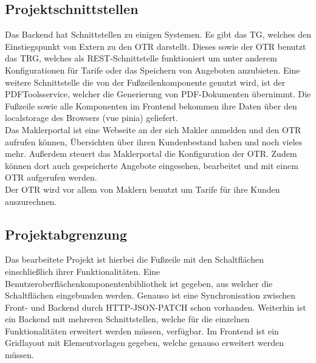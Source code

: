 \subsection{Projektschnittstellen}
\label{projektschnittstellen}
Das Backend hat Schnittstellen zu einigen Systemen. Es gibt das \ac{TG}, welches den Einstiegspunkt von Extern zu den \ac{OTR} darstellt. Dieses sowie der \ac{OTR} benutzt das \ac{TRG}, welches als REST-Schnittstelle funktioniert um unter anderem Konfigurationen für Tarife oder das Speichern von Angeboten anzubieten.
Eine weitere Schnittstelle die von der Fußzeilenkomponente genutzt wird, ist der PDFToolsservice, welcher die Generierung von PDF-Dokumenten übernimmt. Die Fußzeile sowie alle Komponenten im Frontend bekommen ihre Daten über den \gls{localstorage} des Browsers (\gls{vue} \gls{pinia}) geliefert.\\
Das Maklerportal ist eine Webseite an der sich Makler anmelden und den \ac{OTR} aufrufen können, Übersichten über ihren Kundenbestand haben und noch vieles mehr. Außerdem steuert das Maklerportal die Konfiguration der \ac{OTR}. Zudem können dort auch gespeicherte Angebote eingesehen, bearbeitet und mit einem \ac{OTR} aufgerufen werden.\\
Der \ac{OTR} wird vor allem von Maklern benutzt um Tarife für ihre Kunden auszurechnen.


\subsection{Projektabgrenzung}
\label{projektabgrenzung}
Das bearbeitete Projekt ist hierbei die Fußzeile mit den Schaltflächen einschließlich ihrer Funktionalitäten. Eine Benutzeroberflächenkomponentenbibliothek ist gegeben, aus welcher die Schaltflächen eingebunden werden. Genauso ist eine Synchronisation zwischen Front- und Backend durch HTTP-JSON-PATCH schon vorhanden. Weiterhin ist ein Backend mit mehreren Schnittstellen, welche für die einzelnen Funktionalitäten erweitert werden müssen, verfügbar. Im Frontend ist ein Gridlayout mit Elementvorlagen gegeben, welche genauso erweitert werden müssen.